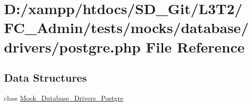 \hypertarget{_admin_2tests_2mocks_2database_2drivers_2postgre_8php}{}\section{D\+:/xampp/htdocs/\+S\+D\+\_\+\+Git/\+L3\+T2/\+F\+C\+\_\+\+Admin/tests/mocks/database/drivers/postgre.php File Reference}
\label{_admin_2tests_2mocks_2database_2drivers_2postgre_8php}
\subsection*{Data Structures}
\begin{DoxyCompactItemize}
\item 
class \hyperlink{class_mock___database___drivers___postgre}{Mock\+\_\+\+Database\+\_\+\+Drivers\+\_\+\+Postgre}
\end{DoxyCompactItemize}
